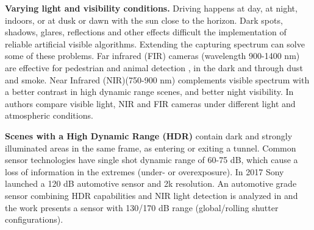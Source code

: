     \textbf{Varying light and visibility conditions.} Driving happens at day, 
    at night, indoors, or at dusk or dawn with the sun close to the horizon. 
    Dark spots, shadows, glares, reflections and other effects difficult the
    implementation of reliable artificial visible algorithms.
    Extending the capturing spectrum can solve some of these problems. 
    Far infrared (FIR) cameras (wavelength 900-1400 nm) 
    are effective for pedestrian and animal detection
    \cite{OMalley2008, Besbes2015}, in the dark and through dust and smoke.
    Near Infrared (NIR)(750-900 nm) complements visible spectrum with a better
    contrast in high dynamic range scenes, and better night visibility. 
    In \cite{Pinchon2018} authors compare visible light, NIR and FIR cameras 
    under different light and atmospheric conditions.
    
\textbf{Scenes with a High Dynamic Range (HDR)} contain dark and strongly
    illuminated areas in the same frame, as entering or exiting a tunnel.
    Common sensor technologies have single shot dynamic range of 60-75 dB,
    which cause a loss of information in the extremes (under- or overexposure).
    In 2017 Sony launched a 120 dB automotive sensor and 2k resolution.
    An automotive grade sensor combining HDR capabilities and NIR
    light detection is analyzed in \cite{Maddalena2005} and the work 
    \cite{Strobel2013} presents a sensor with 130/170 dB range (global/rolling 
    shutter configurations).
        

